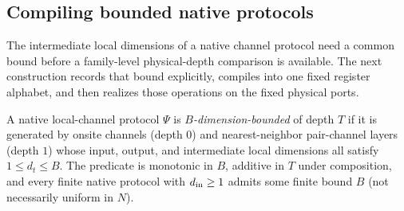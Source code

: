 \subsection{Compiling bounded native protocols}

The intermediate local dimensions of a native channel protocol need a common
bound before a family-level physical-depth comparison is available. The next
construction records that bound explicitly, compiles into one fixed register
alphabet, and then realizes those operations on the fixed physical ports.

\begin{definition}
    \label{def:qc_dimension_bounded_protocol}
    \leanok
    A native local-channel protocol $\Psi$ is \emph{$B$-dimension-bounded} of depth $T$ if it is generated by onsite channels (depth $0$) and nearest-neighbor pair-channel layers (depth $1$) whose input, output, and intermediate local dimensions all satisfy $1\le d_t\le B$. The predicate is monotonic in $B$, additive in $T$ under composition, and every finite native protocol with $d_{\rm in}\ge1$ admits some finite bound $B$ (not necessarily uniform in $N$).
\end{definition}

